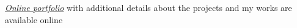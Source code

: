 \begin{cvparagraph}

\href{https://null3rror.github.io/Portfolio/}{\bodyfontlight\slshape\color{awesome}Online portfolio} with additional details about the projects and my works are available online 

\end{cvparagraph}